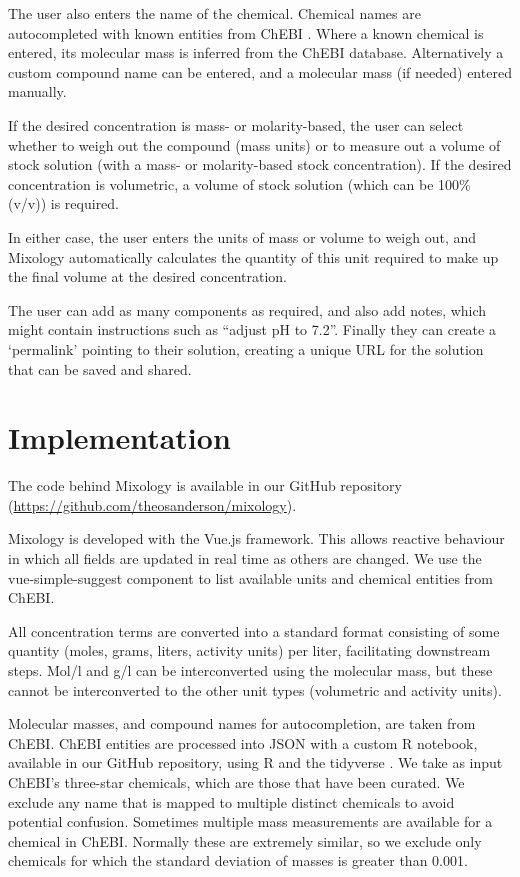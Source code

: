 \documentclass[times, twoside]{zHenriquesLab-StyleBioRxiv}
\begin{document}
The user also enters the name of the chemical. Chemical names are autocompleted with known entities from ChEBI \cite{chebi}. Where a known chemical is entered, its molecular mass is inferred from the ChEBI database. Alternatively a custom compound name can be entered, and a molecular mass (if needed) entered manually.

If the desired concentration is mass- or molarity-based, the user can select whether to weigh out the compound (mass units) or to measure out a volume of stock solution (with a mass- or molarity-based stock concentration). If the desired concentration is volumetric, a volume of stock solution (which can be 100\% (v/v)) is required.

In either case, the user enters the units of mass or volume to weigh out, and Mixology automatically calculates the quantity of this unit required to make up the final volume at the desired concentration.

The user can add as many components as required, and also add notes, which might contain instructions such as ``adjust pH to 7.2''. Finally they can create a `permalink' pointing to their solution, creating a unique URL for the solution that can be saved and shared.


\section*{Implementation}

The code behind Mixology is available in our GitHub repository (\url{https://github.com/theosanderson/mixology}).

Mixology is developed with the Vue.js framework. This allows reactive behaviour in which all fields are updated in real time as others are changed. We use the vue-simple-suggest component \cite{vss} to list available units and chemical entities from ChEBI.

All concentration terms are converted into a standard format consisting of some quantity (moles, grams, liters, activity units) per liter, facilitating downstream steps. Mol/l and g/l can be interconverted using the molecular mass, but these cannot be interconverted to the other unit types (volumetric and activity units).

Molecular masses, and compound names for autocompletion, are taken from ChEBI\cite{chebi}. ChEBI entities are processed into JSON with a custom R notebook, available in our GitHub repository, using R and the tidyverse \cite{R,tidyverse}. We take as input ChEBI's three-star chemicals, which are those that have been curated. We exclude any name that is mapped to multiple distinct chemicals to avoid potential confusion. Sometimes multiple mass measurements are available for a chemical in ChEBI. Normally these are extremely similar, so we exclude only chemicals for which the standard deviation of masses is greater than 0.001.
\end{document}
